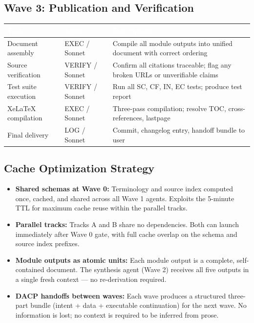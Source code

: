 \documentclass[11pt,letterpaper]{article}
\newcommand{\tableheader}[1]{\textbf{\sffamily\textcolor{white}{#1}}}
\begin{document}
\subsection{Wave 3: Publication and Verification}

\begin{center}
\begin{tabularx}{\textwidth}{L{3.5cm}L{2.5cm}X}
\toprule
{}
\tableheader{Task} & \tableheader{Agent} & \tableheader{Description} \\
\midrule
Document assembly & EXEC / Sonnet & Compile all module outputs into unified document with correct ordering \\
Source verification & VERIFY / Sonnet & Confirm all citations traceable; flag any broken URLs or unverifiable claims \\
Test suite execution & VERIFY / Sonnet & Run all SC, CF, IN, EC tests; produce test report \\
XeLaTeX compilation & EXEC / Sonnet & Three-pass compilation; resolve TOC, cross-references, lastpage \\
Final delivery & LOG / Sonnet & Commit, changelog entry, handoff bundle to user \\
\bottomrule
\end{tabularx}
\end{center}

\subsection{Cache Optimization Strategy}

\begin{itemize}
  \item \textbf{Shared schemas at Wave 0:} Terminology and source index computed once, cached, and shared across all Wave 1 agents. Exploits the 5-minute TTL for maximum cache reuse within the parallel tracks.
  \item \textbf{Parallel tracks:} Tracks A and B share no dependencies. Both can launch immediately after Wave 0 gate, with full cache overlap on the schema and source index prefixes.
  \item \textbf{Module outputs as atomic units:} Each module output is a complete, self-contained document. The synthesis agent (Wave 2) receives all five outputs in a single fresh context --- no re-derivation required.
  \item \textbf{DACP handoffs between waves:} Each wave produces a structured three-part bundle (intent + data + executable continuation) for the next wave. No information is lost; no context is required to be inferred from prose.
\end{itemize}
\end{document}
